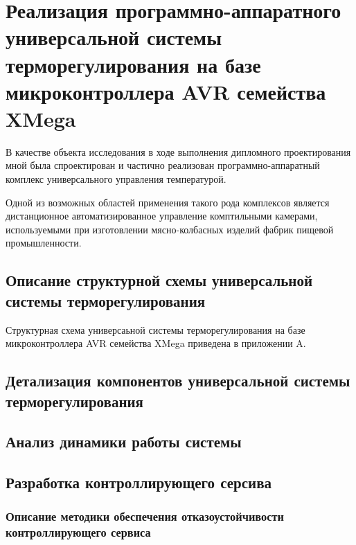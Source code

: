 \section{Реализация программно-аппаратного универсальной
системы терморегулирования на базе микроконтроллера AVR семейства XMega}
В качестве объекта исследования в ходе выполнения дипломного проектирования мной
была спроектирован и частично реализован программно-аппаратный комплекс
универсального управления температурой.

Одной из возможных областей применения такого рода комплексов является дистанционное
автоматизированное управление комптильными камерами, используемыми при изготовлении
мясно-колбасных изделий фабрик пищевой промышленности.

\subsection{Описание структурной схемы универсальной системы терморегулирования}
Структурная схема универсаьной системы терморегулирования на базе микроконтроллера
AVR семейства XMega приведена в приложении A.
% 
% 
% 
\subsection{Детализация компонентов универсальной системы терморегулирования}

\subsection{Анализ динамики работы системы}

\subsection{Разработка контроллирующего серсива}

\subsubsection{Описание методики обеспечения отказоустойчивости контроллирующего
сервиса}


